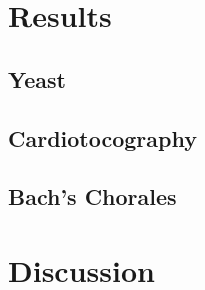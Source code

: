 \documentclass{beamer}
\begin{document}
\section{Results}
\subsection{Yeast}
\subsection{Cardiotocography}
\subsection{Bach's Chorales}

\section{Discussion}
\end{document}
